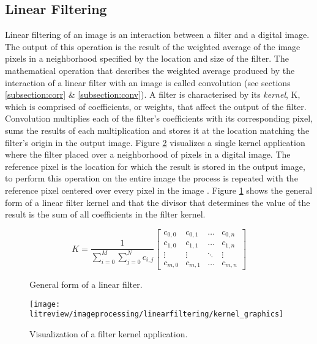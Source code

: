 \subsection{Linear Filtering}

Linear filtering of an image is an interaction between a filter and a digital image. The output of this operation is the result of the weighted average of the image pixels in a neighborhood specified by the location and size of the filter. The mathematical operation that describes the weighted average produced by the interaction of a linear filter with an image is called convolution (see sections \ref{subsection:corr} \& \ref{subsection:conv}). A filter is characterised by its \emph{kernel}, K, which is comprised of coefficients, or weights, that affect the output of the filter. Convolution multiplies each of the filter's coefficients with its corresponding pixel, sums the results of each multiplication and stores it at the location matching the filter's origin in the output image. Figure \ref{fig:kernel_graphics} visualizes a single kernel application where the filter placed over a neighborhood of pixels in a digital image. The reference pixel is the location for which the result is stored in the output image, to perform this operation on the entire image the process is repeated with the reference pixel centered over every pixel in the image \cite{alg_apps}. Figure \ref{fig:generalForm} shows the general form of a linear filter kernel and that the divisor that determines the value of the result is the sum of all coefficients in the filter kernel.

\begin{figure}[h]
   \[K  = \frac{1}{\sum\limits_{i=0}^{M}\sum\limits_{j=0}^{N}c_{i,j}}
    \begin{bmatrix}
      c_{0,0} & c_{0,1} & \dots & c_{0,n} \\
      c_{1,0} & c_{1,1} & \dots & c_{1,n} \\
      \vdots & \vdots & \ddots & \vdots \\
      c_{m,0} & c_{m,1} & \dots & c_{m,n}
    \end{bmatrix}
  \]
  \caption{General form of a linear filter.}
  \label{fig:generalForm}
\end{figure}

\begin{figure}[H]
  \centering
  \centering\texttt{[image: litreview/imageprocessing/linearfiltering/kernel\_graphics]}
  \caption{Visualization of a filter kernel application.}
  \label{fig:kernel_graphics}
\end{figure}










